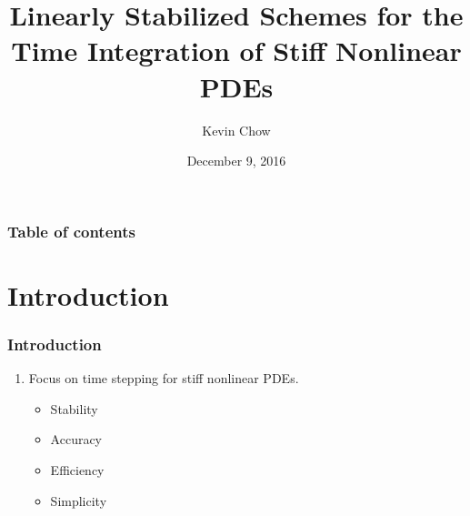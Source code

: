 \documentclass[hyperref={pdfpagelabels=false}]{beamer}
\title[Linearly Stabilized Schemes]{Linearly Stabilized Schemes for the Time Integration of Stiff Nonlinear PDEs}
\author{Kevin Chow}
\date{December 9, 2016}
\begin{document}
\begin{frame}
\titlepage
\end{frame} 


\begin{frame}
\frametitle{Table of contents}
\tableofcontents
\end{frame} 


\section{Introduction} 
\begin{frame}
\frametitle{Introduction}
\begin{enumerate}
	\item Focus on time stepping for stiff nonlinear PDEs.
	\begin{itemize}
		\item Stability
		\item Accuracy
		\item Efficiency
		\item Simplicity
	\end{itemize}
\end{enumerate}
\end{frame}
\end{document}

